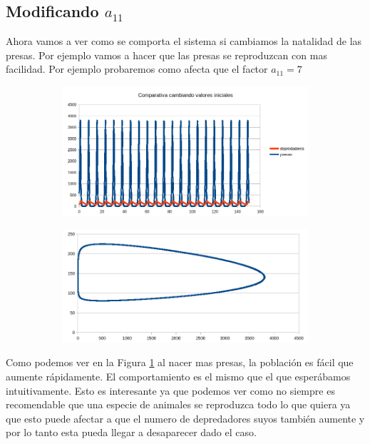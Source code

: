 \documentclass[12pt,a4paper]{article}
\begin{document}
\subsection{Modificando $a_{11}$}
Ahora vamos a ver como se comporta el sistema si cambiamos la natalidad de las presas. Por ejemplo vamos a hacer que las presas se reproduzcan con mas facilidad. Por ejemplo probaremos como afecta que el factor $a_{11}=7$
\begin{figure}[H]
	\centering
	\begin{subfigure}{.5\textwidth}
		\centering
	\includegraphics[width=1\linewidth]{images/ejercicio4_1_1}
		\caption{}
	\label{fig:ejercicio411}
	\end{subfigure}%
	\begin{subfigure}{.5\textwidth}
		\centering
	\includegraphics[width=1\linewidth]{images/ejercicio4_1_2}
		\caption{}
	\label{fig:ejercicio412}
	\end{subfigure}
	
	\label{fig:ejercicio41}
\end{figure}

Como podemos ver en la Figura \ref{fig:ejercicio411} al nacer mas presas, la población es fácil que aumente rápidamente. El comportamiento es el mismo que el que esperábamos intuitivamente. Esto es interesante ya que podemos ver como no siempre es recomendable que una especie de animales se reproduzca todo lo que quiera ya que esto puede afectar a que el numero de depredadores suyos también aumente y por lo tanto esta pueda llegar a desaparecer dado el caso. \newpage
\end{document}
